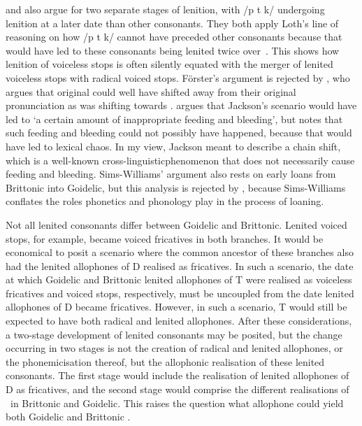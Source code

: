 \Textcite[162]{Foer_Flussname41} and \Textcite{sims-williams_dating_1990} also argue for two separate stages of lenition, with /p t k/ undergoing lenition at a later date than other consonants.
They both apply Loth's line of reasoning on how /p t k/ cannot have preceded other consonants because that would have led to these consonants being lenited twice over~\autocite[\eg][232]{sims-williams_dating_1990}. This shows how  lenition of voiceless stops is often silently equated with the merger of lenited voiceless stops with radical voiced stops. Förster's argument is rejected by \textcite[§~131]{jackson_language_1953}, who argues that original  could well have shifted away from their original pronunciation as  was shifting towards . \Textcite[5]{Tho_Brythonic90} argues that Jackson's scenario would have led to `a certain amount of inappropriate feeding and bleeding', but \textcite[243]{Rus_Introduction95} notes that such feeding and bleeding could not possibly have happened, because that would have led to lexical chaos. In my view, Jackson meant to describe a chain shift, which is a well-known cross-linguisticphenomenon that does not necessarily cause feeding and bleeding. Sims-Williams' argument also rests on early loans from Brittonic into Goidelic, but this analysis is rejected by \textcite{isaac_chronology_2004}, because Sims-Williams conflates the roles  phonetics and phonology play in the process of loaning.

Not all lenited consonants differ between Goidelic and Brittonic. Lenited voiced stops, for example, became voiced fricatives in both branches. It would be economical to posit a scenario where the common ancestor of these branches also had the lenited allophones of \gls{D} realised as fricatives. In such a scenario, the date at which Goidelic and Brittonic lenited allophones of \gls{T} were realised as voiceless fricatives and voiced stops, respectively, must be uncoupled from the date lenited allophones of \gls{D} became fricatives. However, in such a scenario, \gls{T} would still be expected to have both radical and lenited allophones.  After these considerations, a two-stage development of lenited consonants may be posited, but the change occurring in two stages is not the creation of radical and lenited allophones, or the phonemicisation thereof, but the allophonic realisation of these lenited consonants. The first stage would include the realisation of lenited allophones of \gls{D} as fricatives, and the second stage would comprise the different realisations of \lT\ in Brittonic and Goidelic. This raises the question what allophone could yield both Goidelic and Brittonic \lT.

